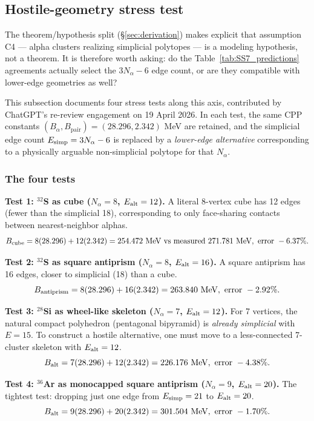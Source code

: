 \documentclass[11pt,letterpaper]{article}
\newcommand{\Bpair}{B_{\mathrm{pair}}}
\newcommand{\Balpha}{B_{\alpha}}
\newcommand{\Nalpha}{N_{\alpha}}
\begin{document}
\subsection{Hostile-geometry stress test}
\label{sec:stress_test}

The theorem/hypothesis split (\S\ref{sec:derivation}) makes explicit that assumption C4 --- alpha clusters realizing simplicial polytopes --- is a modeling hypothesis, not a theorem. It is therefore worth asking: do the Table~\ref{tab:SS7_predictions} agreements actually select the $3\Nalpha - 6$ edge count, or are they compatible with lower-edge geometries as well?

This subsection documents four stress tests along this axis, contributed by ChatGPT's re-review engagement on 19 April 2026. In each test, the same CPP constants $(\Balpha, \Bpair) = (28.296, 2.342)$ MeV are retained, and the simplicial edge count $E_{\rm simp} = 3\Nalpha - 6$ is replaced by a \emph{lower-edge alternative} corresponding to a physically arguable non-simplicial polytope for that $\Nalpha$.

\subsubsection{The four tests}

\textbf{Test 1: ${}^{32}$S as cube ($\Nalpha = 8$, $E_{\rm alt} = 12$).} A literal 8-vertex cube has 12 edges (fewer than the simplicial 18), corresponding to only face-sharing contacts between nearest-neighbor alphas.
\[
B_{\rm cube} = 8(28.296) + 12(2.342) = 254.472 \text{ MeV vs measured } 271.781 \text{ MeV}, \text{ error } -6.37\%.
\]

\textbf{Test 2: ${}^{32}$S as square antiprism ($\Nalpha = 8$, $E_{\rm alt} = 16$).} A square antiprism has 16 edges, closer to simplicial (18) than a cube.
\[
B_{\rm antiprism} = 8(28.296) + 16(2.342) = 263.840 \text{ MeV}, \text{ error } -2.92\%.
\]

\textbf{Test 3: ${}^{28}$Si as wheel-like skeleton ($\Nalpha = 7$, $E_{\rm alt} = 12$).} For 7 vertices, the natural compact polyhedron (pentagonal bipyramid) is \emph{already simplicial} with $E = 15$. To construct a hostile alternative, one must move to a less-connected 7-cluster skeleton with $E_{\rm alt} = 12$.
\[
B_{\rm alt} = 7(28.296) + 12(2.342) = 226.176 \text{ MeV}, \text{ error } -4.38\%.
\]

\textbf{Test 4: ${}^{36}$Ar as monocapped square antiprism ($\Nalpha = 9$, $E_{\rm alt} = 20$).} The tightest test: dropping just one edge from $E_{\rm simp} = 21$ to $E_{\rm alt} = 20$.
\[
B_{\rm alt} = 9(28.296) + 20(2.342) = 301.504 \text{ MeV}, \text{ error } -1.70\%.
\]
\end{document}
